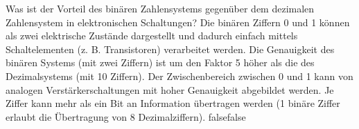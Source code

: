     {Was ist der Vorteil des binären Zahlensystems gegenüber dem dezimalen Zahlensystem in elektronischen Schaltungen?}
    {Die binären Ziffern 0 und 1 können als zwei elektrische Zustände dargestellt und dadurch einfach mittels Schaltelementen (z. B. Transistoren) verarbeitet werden.}
    {Die Genauigkeit des binären Systems (mit zwei Ziffern) ist um den Faktor 5 höher als die des Dezimalsystems (mit 10 Ziffern).}
    {Der Zwischenbereich zwischen 0 und 1 kann von analogen Verstärkerschaltungen mit hoher Genauigkeit abgebildet werden.}
    {Je Ziffer kann mehr als ein Bit an Information übertragen werden (1 binäre Ziffer erlaubt die Übertragung von 8 Dezimalziffern).}
    {false}{false}
